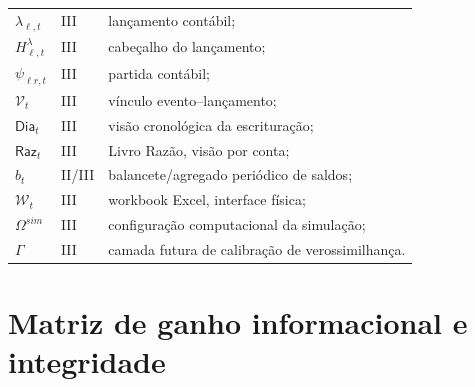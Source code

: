 \documentclass[11pt,a4paper]{article}
\newcommand{\Dia}{\mathsf{Dia}}
\newcommand{\Raz}{\mathsf{Raz}}
\newcommand{\Wb}{\mathcal{W}}
\begin{document}
\begin{longtable}{p{} p{} p{}}
$\lambda_{\ell,t}$ & III & lançamento contábil;\\
$H^\lambda_{\ell,t}$ & III & cabeçalho do lançamento;\\
$\psi_{\ell r,t}$ & III & partida contábil;\\
$\mathcal V_t$ & III & vínculo evento--lançamento;\\
$\Dia_t$ & III & visão cronológica da escrituração;\\
$\Raz_t$ & III & Livro Razão, visão por conta;\\
$b_t$ & II/III & balancete/agregado periódico de saldos;\\
$\Wb_t$ & III & workbook Excel, interface física;\\
$\Omega^{sim}$ & III & configuração computacional da simulação;\\
$\Gamma$ & III & camada futura de calibração de verossimilhança.\\
\bottomrule
\end{longtable}
\normalsize

\section{Matriz de ganho informacional e integridade}
\end{document}
